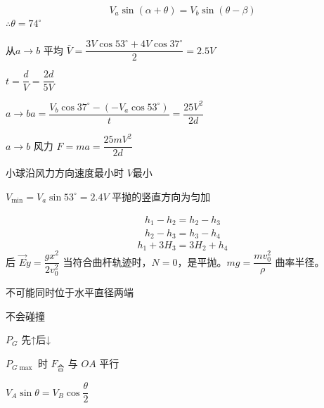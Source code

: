 \[
V_a\sin(\alpha+\theta)=V_b\sin(\theta-\beta)
\]
$\therefore\theta=74^\circ$

从$a\to b$ 平均 $\bar V=\dfrac{3V\cos53^\circ+4V\cos37^\circ}{2}=2.5V$

$t=\dfrac{d}{V}=\dfrac{2d}{5V}$ %

$a\to b$\quad $a=\dfrac{V_b\cos37^\circ-(-V_a\cos53^\circ)}{t}=\dfrac{25V^2}{2d}$ %

$a\to b$ 风力 $F=ma=\dfrac{25mV^2}{2d}$

小球沿风力方向速度最小时 $V$最小 %

$V_{\min}=V_a\sin53^\circ=2.4V$
平抛的竖直方向为匀加


\begin{gather*}
h_1-h_2=h_2-h_3\\
h_2-h_3=h_3-h_4
\end{gather*}
\[ h_1+3H_3=3H_2+h_4 \]%
后 $\vec{E}$\quad $y=\dfrac{gx^2}{2v_0^2}$ 当符合曲杆轨迹时，$N=0$，是平抛。$mg=\dfrac{mv_0^2}{\rho}$ 曲率半径。

不可能同时位于水平直径两端

\quad 不会碰撞

$P_G$ 先↑后↓

$P_{G\max}$ 时 $F_{\text{合}}$ 与 $OA$ 平行


$V_A\sin\theta=V_B\cos\dfrac{\theta}{2}$

